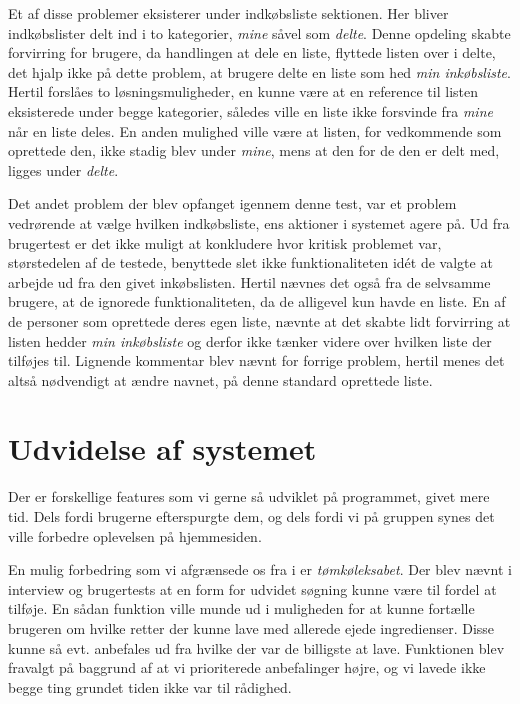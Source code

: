 Et af disse problemer eksisterer under indkøbsliste sektionen.
Her bliver indkøbslister delt ind i to kategorier, \textit{mine} såvel som \textit{delte}.
Denne opdeling skabte forvirring for brugere, da handlingen at dele en liste, flyttede listen over i delte, det hjalp ikke på dette problem, at brugere delte en liste som hed \textit{min inkøbsliste}.
Hertil forslåes to løsningsmuligheder, en kunne være at en reference til listen eksisterede under begge kategorier, således ville en liste ikke forsvinde fra \textit{mine} når en liste deles.
En anden mulighed ville være at listen, for vedkommende som oprettede den, ikke stadig blev under \textit{mine}, mens at den for de den er delt med, ligges under \textit{delte}.

Det andet problem der blev opfanget igennem denne test, var et problem vedrørende at vælge hvilken indkøbsliste, ens aktioner i systemet agere på.
Ud fra brugertest er det ikke muligt at konkludere hvor kritisk problemet var, størstedelen af de testede, benyttede slet ikke funktionaliteten idét de valgte at arbejde ud fra den givet inkøbslisten.
Hertil nævnes det også fra de selvsamme brugere, at de ignorede funktionaliteten, da de alligevel kun havde en liste.
En af de personer som oprettede deres egen liste, nævnte at det skabte lidt forvirring at listen hedder \textit{min inkøbsliste} og derfor ikke tænker videre over hvilken liste der tilføjes til.
Lignende kommentar blev nævnt for forrige problem, hertil menes det altså nødvendigt at ændre navnet, på denne standard oprettede liste.

\section{Udvidelse af systemet}\label{udvidelse}

Der er forskellige features som vi gerne så udviklet på programmet, givet mere tid. Dels fordi brugerne efterspurgte dem, og dels fordi vi på gruppen synes det ville forbedre oplevelsen på hjemmesiden.

En mulig forbedring som vi afgrænsede os fra i  er \textit{tømkøleksabet}.
Der blev nævnt i interview og brugertests at en form for udvidet søgning kunne være til fordel at tilføje.
En sådan funktion ville munde ud i muligheden for at kunne fortælle brugeren om hvilke retter der kunne lave med allerede ejede ingredienser.
Disse kunne så evt. anbefales ud fra hvilke der var de billigste at lave.
Funktionen blev fravalgt på baggrund af at vi prioriterede anbefalinger højre, og vi lavede ikke begge ting grundet tiden ikke var til rådighed.


